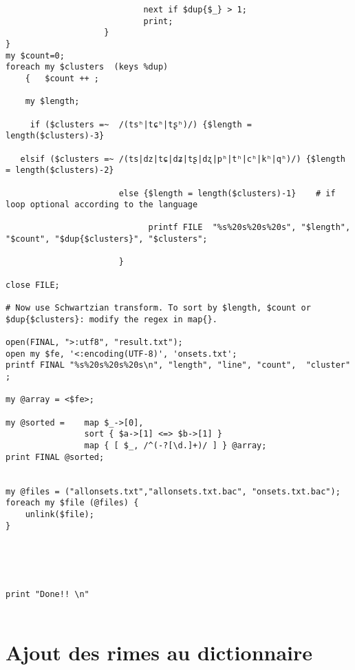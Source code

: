 \documentclass[11pt, a4paper]{book}              %
\begin{document}
\begin{lstlisting}
                            next if $dup{$_} > 1;
                            print;
                    }
}
my $count=0;
foreach my $clusters  (keys %dup)
    {   $count ++ ;
     
    my $length;
    
     if ($clusters =~  /(tsʰ|tɕʰ|tʂʰ)/) {$length = length($clusters)-3}
     
   elsif ($clusters =~ /(ts|dz|tɕ|dʑ|tʂ|dʐ|pʰ|tʰ|cʰ|kʰ|qʰ)/) {$length = length($clusters)-2}
                      
                       else {$length = length($clusters)-1}    # if loop optional according to the language
                             
                             printf FILE  "%s%20s%20s%20s", "$length", "$count", "$dup{$clusters}", "$clusters";
                             
                       }
    
close FILE;

# Now use Schwartzian transform. To sort by $length, $count or $dup{$clusters}: modify the regex in map{}.

open(FINAL, ">:utf8", "result.txt");
open my $fe, '<:encoding(UTF-8)', 'onsets.txt';
printf FINAL "%s%20s%20s%20s\n", "length", "line", "count",  "cluster" ;

my @array = <$fe>; 

my @sorted =    map $_->[0],
                sort { $a->[1] <=> $b->[1] }
                map { [ $_, /^(-?[\d.]+)/ ] } @array;
print FINAL @sorted;

    
my @files = ("allonsets.txt","allonsets.txt.bac", "onsets.txt.bac");
foreach my $file (@files) {
    unlink($file);
}





print "Done!! \n"


\end{lstlisting}



\section*{Ajout des rimes au dictionnaire}
\end{document}
